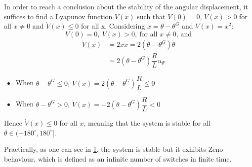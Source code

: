 In order to reach a conclusion about the stability of the angular displacement,
it suffices to find a Lyapunov function $V(x)$ such that $V(0) = 0$, $V(x) > 0$
for all $x \neq 0$ and $\dot{V}(x) \leq 0$ for all x. Considering
$x = \theta - \theta^G$ and $V(x) = x^2$:
$$V(0) = 0,\ V(x) > 0,\ \text{for all } x \neq 0\text{, and}$$
\begin{align*}
  \dot{V}(x) &= 2 x \dot{x} = 2 (\theta - \theta^G) \dot{\theta}  \\
             &= 2 (\theta - \theta^G) \dfrac{R}{L} u_{\Psi}
\end{align*}

\begin{itemize}
  \item When $\theta - \theta^G \leq 0$, $\dot{V}(x) = 2 (\theta - \theta^G) \dfrac{R}{L} \leq 0$
  \item When $\theta - \theta^G > 0$, $\dot{V}(x) = -2 (\theta - \theta^G) \dfrac{R}{L} < 0$
\end{itemize}

Hence $\dot{V}(x) \leq 0$ for all $x$, meaning that the system is stable for all
$\theta \in (-180^{\circ}, 180^{\circ}]$.

Practically, as one can see in \ref{fig:03}, the system is stable but it exhibits
Zeno behaviour, which is defined as an infinite number of switches in finite
time.

\begin{figure}[H]\centering
  \scalebox{0.9}{}
  \caption{}
  \label{fig:03}
\end{figure}
